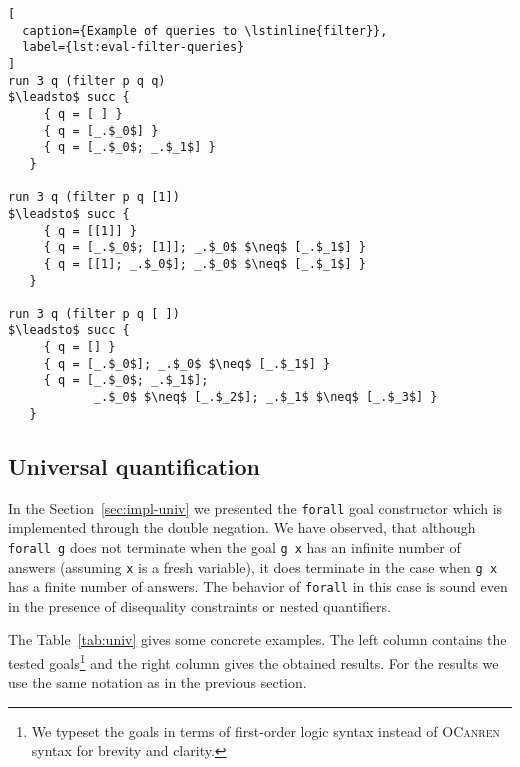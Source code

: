 \begin{minipage}[thb]{0.4\textwidth}
\begin{lstlisting}[
  caption={Example of queries to \lstinline{filter}},
  label={lst:eval-filter-queries}
]
run 3 q (filter p q q) 
$\leadsto$ succ {
     { q = [ ] }
     { q = [_.$_0$] }
     { q = [_.$_0$; _.$_1$] }
   }

run 3 q (filter p q [1]) 
$\leadsto$ succ {
     { q = [[1]] }
     { q = [_.$_0$; [1]]; _.$_0$ $\neq$ [_.$_1$] }
     { q = [[1]; _.$_0$]; _.$_0$ $\neq$ [_.$_1$] }
   }

run 3 q (filter p q [ ]) 
$\leadsto$ succ {
     { q = [] }
     { q = [_.$_0$]; _.$_0$ $\neq$ [_.$_1$] }
     { q = [_.$_0$; _.$_1$]; 
            _.$_0$ $\neq$ [_.$_2$]; _.$_1$ $\neq$ [_.$_3$] }
   }
\end{lstlisting}
\end{minipage}

\subsection{Universal quantification}

In the Section~\ref{sec:impl-univ} we presented 
the \lstinline{forall} goal constructor 
which is implemented through the double negation.
We have observed, that although \lstinline{forall g}
does not terminate when the goal \lstinline{g x} 
has an infinite number of answers 
(assuming \lstinline{x} is a fresh variable),
it does terminate in the case when \lstinline{g x} has 
a finite number of answers.
The behavior of \lstinline{forall} in this case is sound
even in the presence of disequality constraints or nested quantifiers. 

The Table~\ref{tab:univ} gives some concrete examples.
The left column contains the tested goals\footnote{
We typeset the goals in terms of first-order logic syntax 
instead of \textsc{OCanren} syntax for brevity and clarity.} 
and the right column gives the obtained results.
For the results we use the same notation 
as in the previous section.

